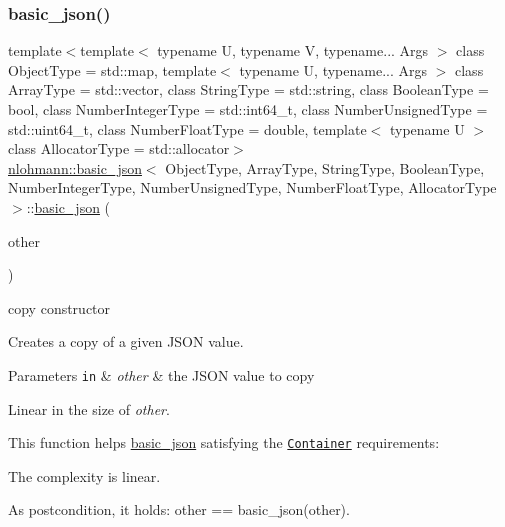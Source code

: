 \subsubsection{\texorpdfstring{basic\+\_\+json()}{basic\_json()}\hspace{0.1cm}{\footnotesize\ttfamily [22/23]}}
{\footnotesize\ttfamily template$<$template$<$ typename U, typename V, typename... Args $>$ class Object\+Type = std\+::map, template$<$ typename U, typename... Args $>$ class Array\+Type = std\+::vector, class String\+Type  = std\+::string, class Boolean\+Type  = bool, class Number\+Integer\+Type  = std\+::int64\+\_\+t, class Number\+Unsigned\+Type  = std\+::uint64\+\_\+t, class Number\+Float\+Type  = double, template$<$ typename U $>$ class Allocator\+Type = std\+::allocator$>$ \\
\hyperlink{classnlohmann_1_1basic__json}{nlohmann\+::basic\+\_\+json}$<$ Object\+Type, Array\+Type, String\+Type, Boolean\+Type, Number\+Integer\+Type, Number\+Unsigned\+Type, Number\+Float\+Type, Allocator\+Type $>$\+::\hyperlink{classnlohmann_1_1basic__json}{basic\+\_\+json} (\begin{DoxyParamCaption}\item[{const \hyperlink{classnlohmann_1_1basic__json}{basic\+\_\+json}$<$ Object\+Type, Array\+Type, String\+Type, Boolean\+Type, Number\+Integer\+Type, Number\+Unsigned\+Type, Number\+Float\+Type, Allocator\+Type $>$ \&}]{other }\end{DoxyParamCaption})\hspace{0.3cm}{\ttfamily [inline]}}



copy constructor 

Creates a copy of a given J\+S\+ON value.


\begin{DoxyParams}[1]{Parameters}
\mbox{\tt in}  & {\em other} & the J\+S\+ON value to copy\\
\hline
\end{DoxyParams}
Linear in the size of {\itshape other}.

This function helps {\ttfamily \hyperlink{classnlohmann_1_1basic__json}{basic\+\_\+json}} satisfying the \href{http://en.cppreference.com/w/cpp/concept/Container}{\tt Container} requirements\+:
\begin{DoxyItemize}
\item The complexity is linear.
\item As postcondition, it holds\+: {\ttfamily other == basic\+\_\+json(other)}.
\end{DoxyItemize}


